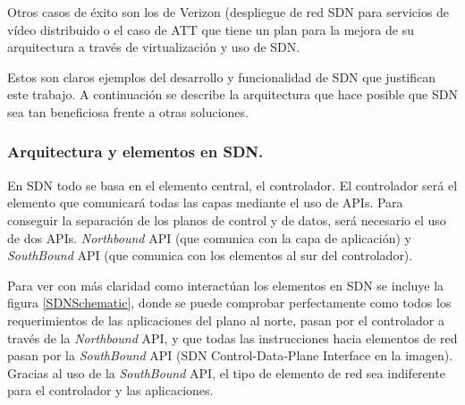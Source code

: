 \documentclass[a4paper,11pt]{book}
\begin{document}
Otros casos de éxito son los de Verizon\cite{verizonSDN}\nocite{verizonSDN} (despliegue de red \ac{SDN} para servicios de vídeo distribuido o el caso de ATT\cite{attSDN}\nocite{attSDN} que tiene un plan para la mejora de su arquitectura a través de virtualización y uso de \ac{SDN}.

Estos son claros ejemplos del desarrollo y funcionalidad de \ac{SDN} que justifican este trabajo. A continuación se describe la arquitectura que hace posible que \ac{SDN} sea tan beneficiosa frente a otras soluciones.

\subsubsection{Arquitectura y elementos en \ac{SDN}.}

En \ac{SDN} todo se basa en el elemento central, el controlador. El controlador será el elemento que comunicará todas las capas mediante el uso de \ac{API}s. Para conseguir la separación de los planos de control y de datos, será necesario el uso de dos \ac{API}s. \textit{Northbound} \ac{API} (que comunica con la capa de aplicación) y \textit{SouthBound} \ac{API} (que comunica con los elementos al sur del controlador).

Para ver con más claridad como interactúan los elementos en \ac{SDN} se incluye la figura \ref{SDNSchematic}, donde se puede comprobar perfectamente como todos los requerimientos de las aplicaciones del plano al norte, pasan por el controlador a través de la \textit{Northbound} \ac{API}, y que todas las instrucciones hacia elementos de red pasan por la \textit{SouthBound} \ac{API} (\ac{SDN} Control-Data-Plane Interface en la imagen). Gracias al uso de la \textit{SouthBound} \ac{API}, el tipo de elemento de red sea indiferente para el controlador y las aplicaciones.
\end{document}
